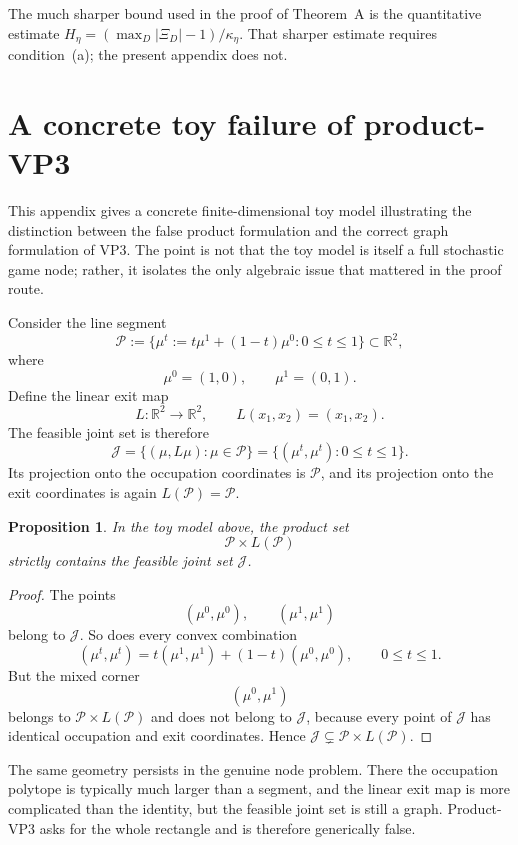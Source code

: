 \documentclass[12pt]{article}
\newtheorem{proposition}[theorem]{Proposition}
\theoremstyle{definition}
\newcommand{\R}{\mathbb{R}}
\newcommand{\1}{\mathbf{1}}
\newcommand{\cP}{\mathcal{P}}
\begin{document}
The much sharper bound used in the proof of Theorem~A is the quantitative estimate
\(H_\eta=(\max_D|\Xi_D|-1)/\kappa_\eta\).  That sharper estimate requires condition~(a); the present
appendix does not.


\section{A concrete toy failure of product-VP3}
\label{app:toy-vp3}

This appendix gives a concrete finite-dimensional toy model illustrating the distinction
between the false product formulation and the correct graph formulation of VP3.  The point
is not that the toy model is itself a full stochastic game node; rather, it isolates the
only algebraic issue that mattered in the proof route.

Consider the line segment
\[
\cP:=
\{\mu^t:=t\mu^1+(1-t)\mu^0:0\le t\le 1\}
\subset \R^2,
\]
where
\[
\mu^0=(1,0),\qquad \mu^1=(0,1).
\]
Define the linear exit map
\[
L:\R^2\to \R^2,\qquad
L(x_1,x_2)=(x_1,x_2).
\]
The feasible joint set is therefore
\[
\mathcal J
=
\{(\mu,L\mu):\mu\in \cP\}
=
\{(\mu^t,\mu^t):0\le t\le 1\}.
\]
Its projection onto the occupation coordinates is \(\cP\), and its projection onto the exit
coordinates is again \(L(\cP)=\cP\).

\begin{proposition}
\label{prop:toy-rectangle}
In the toy model above, the product set
\[
\cP\times L(\cP)
\]
strictly contains the feasible joint set \(\mathcal J\).
\end{proposition}

\begin{proof}
The points
\[
(\mu^0,\mu^0),\qquad (\mu^1,\mu^1)
\]
belong to \(\mathcal J\).  So does every convex combination
\[
(\mu^t,\mu^t)=t(\mu^1,\mu^1)+(1-t)(\mu^0,\mu^0),\qquad 0\le t\le 1.
\]
But the mixed corner
\[
(\mu^0,\mu^1)
\]
belongs to \(\cP\times L(\cP)\) and does not belong to \(\mathcal J\), because every point
of \(\mathcal J\) has identical occupation and exit coordinates.  Hence
\(\mathcal J\subsetneq \cP\times L(\cP)\).
\end{proof}

The same geometry persists in the genuine node problem.  There the occupation polytope is
typically much larger than a segment, and the linear exit map is more complicated than the
identity, but the feasible joint set is still a graph.  Product-VP3 asks for the whole
rectangle and is therefore generically false.
\end{document}
